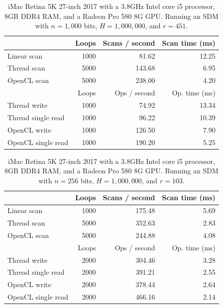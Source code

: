 \begin{table}[!htb]
\centering
\begin{tabular}{| l | r | r | r |}
    \hline
    & Loops & Scans / second & Scan time (ms) \\ \hline
    Linear scan & 1000 & 81.62 & 12.25 \\
    Thread scan & 5000 & 143.68 & 6.95 \\
    OpenCL scan & 5000 & 238.00 & 4.20 \\ \hline
    \hline
    & Loops & Ops / second & Op. time (ms) \\ \hline
    Thread write & 1000 & 74.92 & 13.34 \\
    Thread single read & 1000 & 96.22 & 10.39 \\
    OpenCL write & 1000 & 126.50 & 7.90 \\
    OpenCL single read & 1000 & 190.20 & 5.25 \\
    \hline
\end{tabular}
\caption{iMac Retina 5K 27-inch 2017 with a 3.8GHz Intel core i5 processor, 8GB DDR4 RAM, and a Radeon Pro 580 8G GPU. Running an SDM with $n=1,000$ bits, $H=1,000,000$, and $r=451$.
\label{tab:perf-imac-1000}}
\end{table}

\begin{table}[!htb]
\centering
\begin{tabular}{| l | r | r | r |}
    \hline
    & Loops & Scans / second & Scan time (ms) \\ \hline
    Linear scan & 1000 & 175.48 & 5.69 \\
    Thread scan & 5000 & 352.63 & 2.83 \\
    OpenCL scan & 5000 & 244.88 & 4.08 \\ \hline
    \hline
    & Loops & Ops / second & Op. time (ms) \\ \hline
    Thread write & 2000 & 304.46 & 3.28 \\
    Thread single read & 2000 & 391.21 & 2.55 \\
    OpenCL write & 2000 & 378.44 & 2.64 \\
    OpenCL single read & 2000 & 466.16 & 2.14 \\
    \hline
\end{tabular}
\caption{iMac Retina 5K 27-inch 2017 with a 3.8GHz Intel core i5 processor, 8GB DDR4 RAM, and a Radeon Pro 580 8G GPU. Running an SDM with $n=256$ bits, $H=1,000,000$, and $r=103$.
\label{tab:perf-imac-256}}
\end{table}

